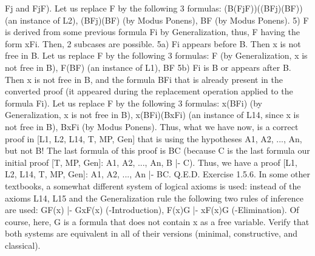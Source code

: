 Fj and Fj\IMPLIES F). Let us replace F by the following 3 formulas:
(B\IMPLIES (Fj\IMPLIES F))\IMPLIES ((B\IMPLIES Fj)\IMPLIES (B\IMPLIES F)) (an instance of L2),
(B\IMPLIES Fj)\IMPLIES (B\IMPLIES F) (by Modus Ponens),
B\IMPLIES F (by Modus Ponens).
5) F is derived from some previous formula Fi by Generalization, thus, F having the form \forall xFi. Then, 2
subcases are possible.
5a) Fi appears before B. Then x is not free in B. Let us replace F by the following 3 formulas:
F (by Generalization, x is not free in B),
F\IMPLIES (B\IMPLIES F) (an instance of L1),
B\IMPLIES F
5b) Fi is B or appears after B. Then x is not free in B, and the formula B\IMPLIES Fi that is already present in the
converted proof (it appeared during the replacement operation applied to the formula Fi). Let us replace F
by the following 3 formulas:
\forall x(B\IMPLIES Fi) (by Generalization, x is not free in B),
\forall x(B\IMPLIES Fi)\IMPLIES (B\IMPLIES \forall xFi) (an instance of L14, since x is not free in B),
B\IMPLIES \forall xFi (by Modus Ponens).
Thus, what we have now, is a correct proof in [L1, L2, L14, T, MP, Gen] that is using the hypotheses A1,
A2, ..., An, but not B! The last formula of this proof is B\IMPLIES C (because C is the last formula our initial
proof [T, MP, Gen]: A1, A2, ..., An, B |- C). Thus, we have a proof [L1, L2, L14, T, MP, Gen]: A1, A2, ...,
An |- B\IMPLIES C. Q.E.D.
Exercise 1.5.6. In some other textbooks, a somewhat different system of logical axioms is used: instead
of the axioms L14, L15 and the Generalization rule the following two rules of inference are used:
G\IMPLIES F(x) |- G\IMPLIES \forall xF(x) (\forall -Introduction),
F(x)\IMPLIES G |- \exists xF(x)\IMPLIES G (\exists -Elimination).
Of course, here, G is a formula that does not contain x as a free variable. Verify that both systems are
equivalent in all of their versions (minimal, constructive, and classical).

